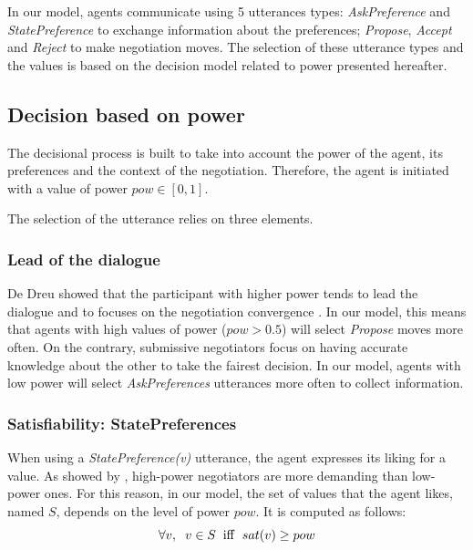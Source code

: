 \documentclass[sigconf]{aamas}  %
\begin{document}
	\par
	In our model, agents communicate using 5 utterances types: \emph{AskPreference} and \emph{StatePreference} to exchange information about the preferences; \emph{Propose}, \emph{Accept} and \emph{Reject} to make negotiation moves. The selection of these utterance types and the values is based on the decision model related to power presented hereafter.
	
	\subsection{Decision based on power}
	
	The decisional process is built to take into account the power of the agent, its preferences and the context of the negotiation. Therefore, the agent is initiated with a value of power $pow \in [0,1]$. 
	
	The selection of the utterance relies on three elements.
	
	\subsubsection{Lead of the dialogue}
	De Dreu showed that the participant with higher power tends to lead the dialogue and to focuses on the negotiation convergence \cite{magee2007power,de2004influence}. In our model, this means that agents with high values of power ($pow>0.5$) will select \emph{Propose} moves more often. On the contrary, submissive negotiators focus on having accurate knowledge about the other to take the fairest decision. In our model, agents with low power will select \emph{AskPreferences} utterances more often to collect information.
	
	\subsubsection{Satisfiability: StatePreferences}
	\label{sec:sat}
	When using a \emph{StatePreference(v)} utterance, the agent expresses its liking for a value. As showed by \cite{de1995impact}, high-power negotiators are more demanding than low-power ones. For this reason, in our model, the set of values that the agent likes, named $S$, depends on the level of power $pow$. It is computed as follows:
	\begin{equation}
	\forall v,\hspace{2mm} v\in S\hspace{2mm}\mathrm{iff}\hspace{2mm}sat(v) \geq pow
	\end{equation}
	
\end{document}
